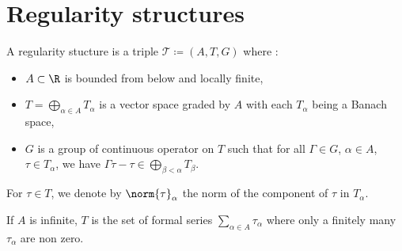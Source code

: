\chapter{Regularity structures}

\begin{definition}
    A regularity stucture is a triple $\mathcal{T}\coloneq (A,T,G)$ where :
    \begin{itemize}
        \item $A\subset \R$ is bounded from below and locally finite,
        \item $T = \bigoplus_{\alpha\in A} T_\alpha$ is a vector space graded by $A$ with each $T_\alpha$ being a Banach space,
        \item $G$ is a group of continuous operator on $T$ such that for all $\Gamma \in G$, $\alpha \in A$, $\tau \in T_\alpha$, we have $\Gamma \tau - \tau \in \bigoplus_{\beta < \alpha} T_\beta$.
    \end{itemize} 
\end{definition}
\begin{remark}
    For $\tau\in T$, we denote by $\norm{\tau}_{\alpha}$ the norm of the component of $\tau$ in $T_\alpha$.
\end{remark}

\begin{remark}
    If $A$ is infinite, $T$ is the set of formal series $\sum_{\alpha \in A} \tau_\alpha$ where only a finitely many $\tau_\alpha$ are non zero.
\end{remark}

